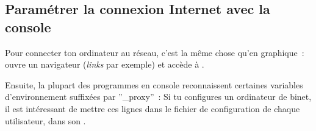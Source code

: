 \subsection{Paramétrer la connexion Internet avec la console}
\label{linux_cmdline}
Pour connecter ton ordinateur au réseau, c'est la même chose qu'en graphique~: ouvre un navigateur (\emph{links} par exemple) et accède à .

%
%
%
Ensuite, la plupart des programmes en console reconnaissent certaines variables d'environnement suffixées par ''\_proxy''~:
\noindent {}
Si tu configures un ordinateur de binet, il est intéressant de mettre ces lignes dans le fichier de configuration de chaque utilisateur, dans son .
